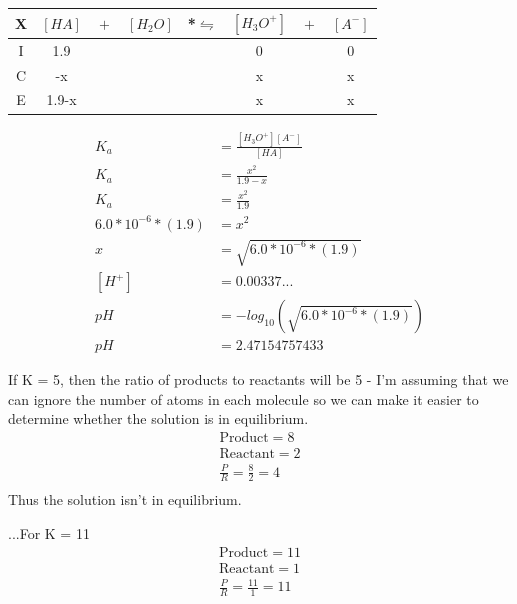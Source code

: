\documentclass{article}  %
\begin{document}
\begin{tabular}{c|c@{}c@{}c@{}c@{}c@{}c@{}c}
    \hline
    X   & $[HA]$ & ${}+{}$ & $[H_2O]$ & *${}\leftrightharpoons{}$ & $[H_3O^+]$ & ${}+{}$ & $[A^-]$ \\
    \hline
    I   &  1.9    &&     &&  0   && 0  \\
    C   &   -x   &&     &&  x   &&  x \\
    E   &   1.9-x   &&     &&   x  && x  \\      
\end{tabular}

\begin{equation*}
    \begin{aligned}
        K_a &= \frac{[H_3O^+][A^-]}{[HA]} \\
        K_a &= \frac{x^2}{1.9-x} \\
        K_a &= \frac{x^2}{1.9} \\
        6.0*10^{-6}*(1.9) &= x^2 \\
        x &= \sqrt{6.0*10^{-6}*(1.9)} \\
        [H^+] &= 0.00337... \\
        pH &= -log_{10}\left(\sqrt{6.0*10^{-6}*(1.9)}\right) \\
        pH &= 2.47154757433
    \end{aligned}
\end{equation*}

If K = 5, then the ratio of products to reactants will be 5 - I'm assuming that we can ignore the number of atoms in each molecule so we can make it easier to determine whether the solution is in equilibrium.
\begin{equation*}
    \begin{aligned}
        \text{Product} = 8 \\
        \text{Reactant} = 2 \\
        \frac{P}{R} = \frac{8}{2} = 4 \\
    \end{aligned}
\end{equation*}
Thus the solution isn't in equilibrium.

...For K = 11
\begin{equation*}
    \begin{aligned}
        \text{Product} = 11 \\
        \text{Reactant} = 1 \\
        \frac{P}{R} = \frac{11}{1} = 11 \\
    \end{aligned}
\end{equation*}
\end{document}
